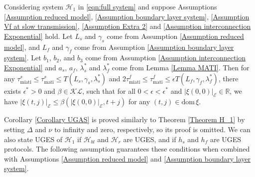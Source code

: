 \begin{cor}
Considering system $\mathcal{H}_1$ in \eqref{eqn:full system} and suppose Assumptions \ref{Assumption reduced model}, \ref{Assumption boundary layer system}, \ref{Assumption Vf at slow transmission}, \ref{Assumption Extra 2} and \ref{Assumption interconnection Exponential} hold.
%
Let $L_s$ and $\gamma_s$ come from Assumption \ref{Assumption reduced model}, and $L_f$ and $\gamma_f$ come from Assumption \ref{Assumption boundary layer system}.
%
Let $b_1$, $b_2$, and $b_3$ come from Assumption \ref{Assumption interconnection Exponential} and $a_s$, $a_f$, $\lambda_s^*$ and $\lambda_f^*$ come from Lemma \ref{Lemma MATI}.
%
Then for any $\tau_{\text{miati}}^s \leq \tau_{\text{mati}}^s \leq T(L_s, \gamma_s, \lambda_s^*)$ and $ 2\tau_{\text{miati}}^f \leq \tau_{\text{mati}}^f \leq \epsilon T(L_f, \gamma_f,\lambda_f^*)$, there exists $\epsilon^* >0 $ and $\beta \in \mathcal{KL}$, such that for all $0<\epsilon<\epsilon^*$ and $ |\xi(0,0)|_{\mathcal{E}} \in \mathbb{R}$, we have $|\xi(t,j)|_\mathcal{E} \leq \beta(|\xi(0,0)|_\mathcal{E}, t+j)$ for any $(t,j)\in \text{dom} \, \xi$.
\label{Corollary UGAS}
\end{cor}
Corollary \ref{Corollary UGAS} is proved similarly to Theorem \ref{Theorem H_1} by setting $\Delta$ and $\nu$ to infinity and zero, respectively, so its proof is omitted.
We can also state UGES of $\mathcal{H}_1$ if $\mathcal{H}_{bl}$ and $\mathcal{H}_r$ are UGES, and if $h_s$ and $h_f$ are UGES protocols.
The following assumption guarantees these conditions when combined with Assumptions \ref{Assumption reduced model} and \ref{Assumption boundary layer system}.
